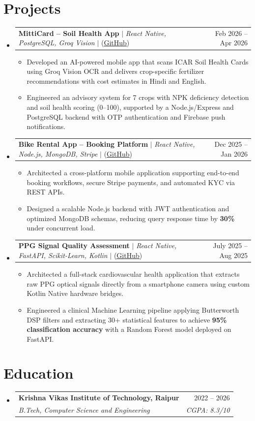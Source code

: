 \documentclass[letterpaper,11pt]{article}
\makeatletter
\newcommand{\resumeItem}[1]{
  \item\small{
    {#1 \vspace{-2pt}}
  }
}
\newcommand{\resumeEduHeading}[4]{
  \vspace{-1pt}\item
    \begin{tabular*}{0.97\textwidth}[t]{l@{\extracolsep{\fill}}r}
      \textbf{#1} & #2 \\
      \textit{\small#3} & \textit{\small #4} \\
    \end{tabular*}\vspace{-3pt}
}
\newcommand{\resumeProjectHeading}[2]{
    \vspace{-1pt}\item
    \begin{tabular*}{0.97\textwidth}{l@{\extracolsep{\fill}}r}
      \small#1 & #2 \\
    \end{tabular*}\vspace{-5pt}
}
\newcommand{\resumeSubHeadingListStart}{\begin{itemize}[leftmargin=0.15in, label={}]}
\newcommand{\resumeSubHeadingListEnd}{\end{itemize}\vspace{-4pt}}
\newcommand{\resumeItemListStart}{\begin{itemize}}
\newcommand{\resumeItemListEnd}{\end{itemize}\vspace{-5pt}}
\makeatother
\begin{document}
\section{Projects}
    \resumeSubHeadingListStart
      \resumeProjectHeading
          {\textbf{MittiCard -- Soil Health App} $|$ \emph{React Native, PostgreSQL, Groq Vision} $|$ (\href{https://github.com/Rajkamal08/MittiCard}{\underline{GitHub}})}{Feb 2026 -- Apr 2026}
          \resumeItemListStart
            \resumeItem{Developed an AI-powered mobile app that scans ICAR Soil Health Cards using Groq Vision OCR and delivers crop-specific fertilizer recommendations with cost estimates in Hindi and English.}
            \resumeItem{Engineered an advisory system for 7 crops with NPK deficiency detection and soil health scoring (0--100), supported by a Node.js/Express and PostgreSQL backend with OTP authentication and Firebase push notifications.}
          \resumeItemListEnd
      \resumeProjectHeading
          {\textbf{Bike Rental App -- Booking Platform} $|$ \emph{React Native, Node.js, MongoDB, Stripe} $|$ (\href{https://github.com/Rajkamal08/bike}{\underline{GitHub}})}{Dec 2025 -- Jan 2026}
          \resumeItemListStart
            \resumeItem{Architected a cross-platform mobile application supporting end-to-end booking workflows, secure Stripe payments, and automated KYC via REST APIs.}
            \resumeItem{Designed a scalable Node.js backend with JWT authentication and optimized MongoDB schemas, reducing query response time by \textbf{30\%} under concurrent load.}
          \resumeItemListEnd
      \resumeProjectHeading
          {\textbf{PPG Signal Quality Assessment} $|$ \emph{React Native, FastAPI, Scikit-Learn, Kotlin} $|$ (\href{https://github.com/Rajkamal08/PPG-Signal-Quality-Assessment}{\underline{GitHub}})}{July 2025 -- Aug 2025}
          \resumeItemListStart
            \resumeItem{Architected a full-stack cardiovascular health application that extracts raw PPG optical signals directly from a smartphone camera using custom Kotlin Native hardware bridges.}
            \resumeItem{Engineered a clinical Machine Learning pipeline applying Butterworth DSP filters and extracting 30+ statistical features to achieve \textbf{95\% classification accuracy} with a Random Forest model deployed on FastAPI.}
          \resumeItemListEnd

    \resumeSubHeadingListEnd


\section{Education}
  \resumeSubHeadingListStart
    \resumeEduHeading
      {Krishna Vikas Institute of Technology, Raipur}{2022 -- 2026}
      {B.Tech, Computer Science and Engineering}{CGPA: 8.3/10}
  \resumeSubHeadingListEnd
\end{document}
